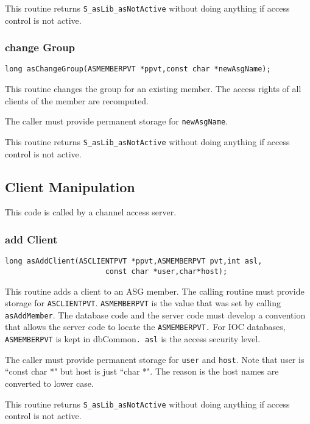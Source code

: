 This routine returns \verb|S_asLib_asNotActive| without doing anything if access control is not active.

\subsubsection{change Group}

\begin{verbatim}long asChangeGroup(ASMEMBERPVT *ppvt,const char *newAsgName);
\end{verbatim}This routine changes the group for an existing member. The access rights of all clients of the member are recomputed.

The caller must provide permanent storage for \verb|newAsgName|.

This routine returns \verb|S_asLib_asNotActive| without doing anything if access control is not active.

\subsection{ Client Manipulation}

This code is called by a channel access server.

\subsubsection{add Client}

\begin{verbatim}long asAddClient(ASCLIENTPVT *ppvt,ASMEMBERPVT pvt,int asl,
                       const char *user,char*host);
\end{verbatim}This routine adds a client to an ASG member. The calling routine must provide storage for \verb|ASCLIENTPVT|. 
\verb|ASMEMBERPVT| is the value that was set by calling \verb|asAddMember|. The database code and the server code must develop 
a convention that allows the server code to locate the \verb|ASMEMBERPVT.| For IOC databases,  \verb|ASMEMBERPVT| is kept in 
dbCommon\verb|. asl| is the access security level.

The caller must provide permanent storage for \verb|user| and \verb|host|. Note that user is ``const char *" but host is just ``char *". 
The reason is the host names are converted to lower case.

This routine returns \verb|S_asLib_asNotActive| without doing anything if access control is not active.


